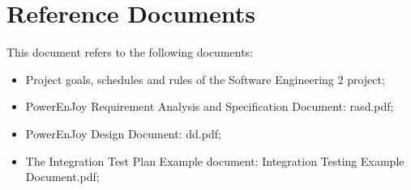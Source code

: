 \section{Reference Documents}
This document refers to the following documents:
\begin{itemize}
\item Project goals, schedules and rules of the Software Engineering 2 project;
\item PowerEnJoy Requirement Analysis and Specification Document: rasd.pdf;
\item PowerEnJoy Design Document: dd.pdf;
\item The Integration Test Plan Example document: Integration Testing Example Document.pdf;
\end{itemize}